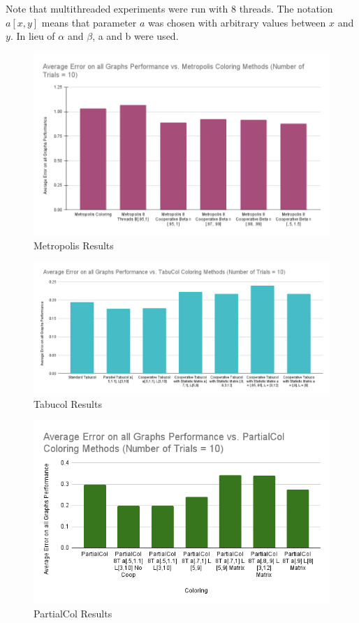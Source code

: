 \documentclass[runningheads]{llncs}
\begin{document}
Note that multithreaded experiments were run with 8 threads. The notation $a[x,y]$ means that parameter $a$ was chosen with arbitrary values between $x$ and $y$. In lieu of $\alpha$ and $\beta$, a and b were used. 

\begin{figure}[h]
\centering
\includegraphics[width=1.125\textwidth]{Metropolis.png}
\caption{Metropolis Results}
\label{fig:metr1}
\end{figure}

\begin{figure}[h]
\centering
\includegraphics[width=1\textwidth]{Tabucol.png}
\caption{Tabucol Results}
\label{fig:TabuColl}
\end{figure}


\begin{figure}[h]
\centering
\includegraphics[width=1\textwidth]{PartialCol.png}
\caption{PartialCol Results}
\label{fig:partialcol}
\end{figure}


\clearpage

\printbibliography
\end{document}
